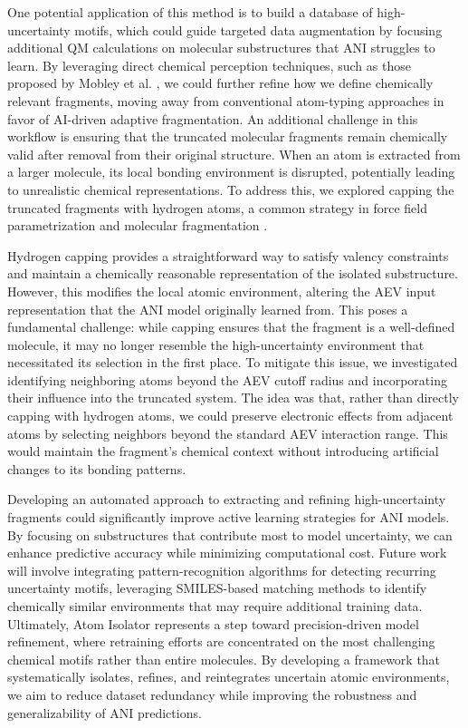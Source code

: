 One potential application of this method is to build a database of high-uncertainty motifs, which could guide targeted data augmentation by focusing additional QM calculations on molecular substructures that ANI struggles to learn. By leveraging direct chemical perception techniques, such as those proposed by Mobley et al. \cite{direct_chem_perception_mobley}, we could further refine how we define chemically relevant fragments, moving away from conventional atom-typing approaches in favor of AI-driven adaptive fragmentation. An additional challenge in this workflow is ensuring that the truncated molecular fragments remain chemically valid after removal from their original structure. When an atom is extracted from a larger molecule, its local bonding environment is disrupted, potentially leading to unrealistic chemical representations. To address this, we explored capping the truncated fragments with hydrogen atoms, a common strategy in force field parametrization and molecular fragmentation \cite{protein_ff_fragmentation_nn_wang}.

Hydrogen capping provides a straightforward way to satisfy valency constraints and maintain a chemically reasonable representation of the isolated substructure. However, this modifies the local atomic environment, altering the AEV input representation that the ANI model originally learned from. This poses a fundamental challenge: while capping ensures that the fragment is a well-defined molecule, it may no longer resemble the high-uncertainty environment that necessitated its selection in the first place. To mitigate this issue, we investigated identifying neighboring atoms beyond the AEV cutoff radius and incorporating their influence into the truncated system. The idea was that, rather than directly capping with hydrogen atoms, we could preserve electronic effects from adjacent atoms by selecting neighbors beyond the standard AEV interaction range. This would maintain the fragment’s chemical context without introducing artificial changes to its bonding patterns.

Developing an automated approach to extracting and refining high-uncertainty fragments could significantly improve active learning strategies for ANI models. By focusing on substructures that contribute most to model uncertainty, we can enhance predictive accuracy while minimizing computational cost. Future work will involve integrating pattern-recognition algorithms for detecting recurring uncertainty motifs, leveraging SMILES-based matching methods \cite{SMILES_pair_encoding_li} to identify chemically similar environments that may require additional training data. Ultimately, Atom Isolator represents a step toward precision-driven model refinement, where retraining efforts are concentrated on the most challenging chemical motifs rather than entire molecules. By developing a framework that systematically isolates, refines, and reintegrates uncertain atomic environments, we aim to reduce dataset redundancy while improving the robustness and generalizability of ANI predictions.

